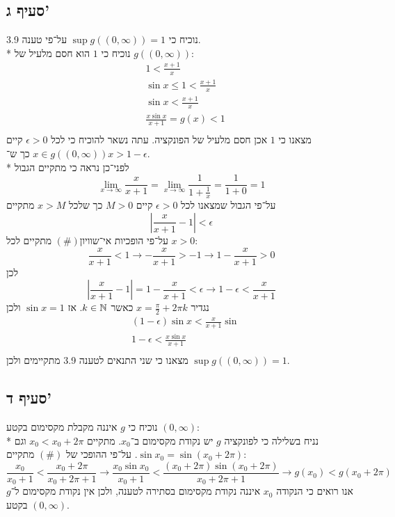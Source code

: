 \subsection{סעיף ג'}
נוכיח כי $\sup g\left( (0, \infty) \right) = 1$ על־פי טענה 3.9. \\*
נוכיח כי $1$ הוא חסם מלעיל של $g((0, \infty))$:
\begin{align*}
	& 1 < \frac{x + 1}{x} \tag{\#} \\
	& \sin x \le 1 < \frac{x + 1}{x} \\
	& \sin x < \frac{x + 1}{x} \\
	& \frac{x \sin x}{x + 1} = g(x) < 1 \\
\end{align*}
מצאנו כי $1$ אכן חסם מלעיל של הפונקציה. עתה נשאר להוכיח כי לכל $\epsilon > 0$ קיים $x \in g((0, \infty))$ כך ש־$x > 1 - \epsilon$. \\*
לפני־כן נראה כי מתקיים הגבול
\[
	\lim_{x \to \infty} \frac{x}{x + 1}
	= \lim_{x \to \infty} \frac{1}{1 + \frac{1}{x}}
	= \frac{1}{1 + 0}
	= 1
\]
על־פי הגבול שמצאנו לכל $\epsilon > 0$ קיים $M > 0$ כך שלכל $x > M$ מתקיים
\[
	\left| \frac{x}{x + 1} - 1 \right| < \epsilon
\]
על־פי הופכיות אי־שוויון$(\#)$ מתקיים לכל $x > 0$:
\[
	\frac{x}{x + 1} < 1 \rightarrow
	-\frac{x}{x + 1} > -1 \rightarrow
	1 - \frac{x}{x + 1} > 0
\]
לכן
\[
	\left| \frac{x}{x + 1} - 1 \right| = 1 - \frac{x}{x + 1} < \epsilon
	\rightarrow 1 - \epsilon < \frac{x}{x + 1}
\]
נגדיר $x = \frac{\pi}{2} + 2\pi k$ כאשר $k \in \mathbb{N}$.
אז $\sin x = 1$ ולכן
\begin{align*}
	& (1 - \epsilon) \sin x < \frac{x}{x + 1} \sin \\
	& 1 - \epsilon < \frac{x \sin x}{x + 1} \\
\end{align*}
מצאנו כי שני התנאים לטענה 3.9 מתקיימים ולכן $\sup g((0, \infty)) = 1$.

\subsection{סעיף ד'}
נוכיח כי $g$ איננה מקבלת מקסימום בקטע $(0, \infty)$: \\*
נניח בשלילה כי לפונקציה $g$ יש נקודת מקסימום ב־$x_0$.
מתקיים $x_0 < x_0 + 2\pi$ וגם $\sin x_0 = \sin(x_0 + 2\pi)$.
על־פי ההופכי של $(\#)$ מתקיים:
\[
	\frac{x_0}{x_0 + 1} < \frac{x_0 + 2\pi}{x_0 + 2\pi + 1}
	\rightarrow
	\frac{x_0 \sin x_0}{x_0 + 1} < \frac{(x_0 + 2\pi) \sin(x_0 + 2\pi)}{x_0 + 2\pi + 1}
	\rightarrow
	g(x_0) < g(x_0 + 2\pi)
\]
אנו רואים כי הנקודה $x_0$ איננה נקודת מקסימום בסתירה לטענה,
ולכן אין נקודת מקסימום ל־$g$ בקטע $(0, \infty)$.

